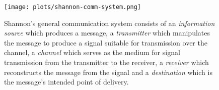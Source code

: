 \begin{figure}
\centering
\texttt{[image: plots/shannon-comm-system.png]}
\caption[\label{fig:shannon-comm-system}Shannon's general communication system consists of
an \textit{information source} which produces a message,
a \textit{transmitter} which manipulates the message to produce a signal suitable for transmission over the channel,
a \textit{channel} which serves as the medium for signal transmission from the transmitter to the receiver,
a \textit{receiver} which reconstructs the message from the signal and
a \textit{destination} which is the message's intended point of delivery.]{\label{fig:shannon-comm-system}Shannon's general communication system consists of
an \textit{information source} which produces a message,
a \textit{transmitter} which manipulates the message to produce a signal suitable for transmission over the channel,
a \textit{channel} which serves as the medium for signal transmission from the transmitter to the receiver,
a \textit{receiver} which reconstructs the message from the signal and
a \textit{destination} which is the message's intended point of delivery\protect\footnotemark[1].}
\end{figure}
